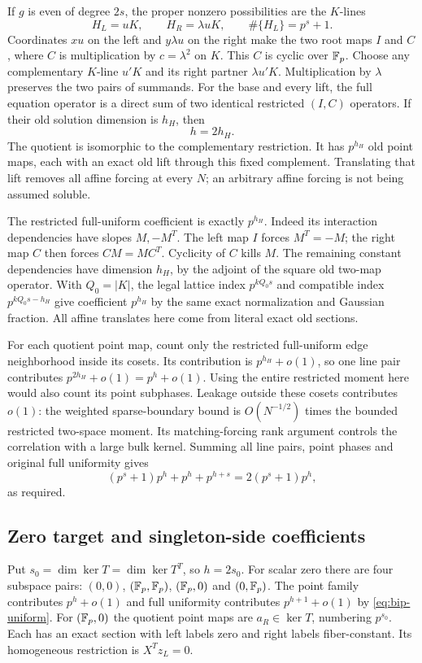 If $g$ is even of degree $2s$, the proper nonzero possibilities are
the $K$-lines
\[
 H_L=uK,\qquad H_R=\lambda uK,
 \qquad \#\{H_L\}=p^s+1.
\]
Coordinates $xu$ on the left and $y\lambda u$ on the right make
the two root maps $I$ and $C$, where $C$ is multiplication by
$c=\lambda^2$ on $K$. This $C$ is cyclic over $\mathbb F_p$.
Choose any complementary $K$-line $u'K$ and its right partner
$\lambda u'K$. Multiplication by $\lambda$ preserves the two
pairs of summands. For the base and every lift, the full equation
operator is a direct sum of two identical restricted $(I,C)$
operators. If their old solution dimension is $h_H$, then
\begin{equation}\label{eq:bip-line-splitting}
 h=2h_H.
\end{equation}
The quotient is isomorphic to the complementary restriction. It has
$p^{h_H}$ old point maps, each with an exact old lift through this
fixed complement. Translating that lift removes all affine forcing
at every $N$; an arbitrary affine forcing is not being assumed soluble.

The restricted full-uniform coefficient is exactly $p^{h_H}$.
Indeed its interaction dependencies have slopes $M,-M^T$.
The left map $I$ forces $M^T=-M$; the right map $C$ then forces
$CM=MC^T$. Cyclicity of $C$ kills $M$. The remaining constant
dependencies have dimension $h_H$, by the adjoint of the square
old two-map operator. With $Q_0=|K|$, the legal lattice index
$p^{kQ_0s}$ and compatible index $p^{kQ_0s-h_H}$ give coefficient
$p^{h_H}$ by the same exact normalization and Gaussian fraction.
All affine translates here come from literal exact old sections.

For each quotient point map, count only the restricted full-uniform
edge neighborhood inside its cosets. Its contribution is
$p^{h_H}+o(1)$, so one line pair contributes $p^{2h_H}+o(1)=p^h+o(1)$.
Using the entire restricted moment here would also count its point
subphases. Leakage outside these cosets contributes $o(1)$: the
weighted sparse-boundary bound is $O(N^{-1/2})$ times the bounded
restricted two-space moment. Its matching-forcing rank argument
controls the correlation with a large bulk kernel.
Summing all line pairs, point phases and original full uniformity
gives
\[
 (p^s+1)p^h+p^h+p^{h+s}=2(p^s+1)p^h,
\]
as required.

\subsection{Zero target and singleton-side coefficients}
Put $s_0=\dim\ker T=\dim\ker T^T$, so $h=2s_0$.
For scalar zero there are four subspace pairs:
$(0,0)$, $(\mathbb F_p,\mathbb F_p)$, $(\mathbb F_p,0)$ and $(0,\mathbb F_p)$.
The point family contributes $p^h+o(1)$ and full uniformity
contributes $p^{h+1}+o(1)$ by \eqref{eq:bip-uniform}.
For $(\mathbb F_p,0)$ the quotient point maps are
$a_R\in\ker T$, numbering $p^{s_0}$. Each has an exact section
with left labels zero and right labels fiber-constant. Its homogeneous
restriction is $X^Tz_L=0$.

